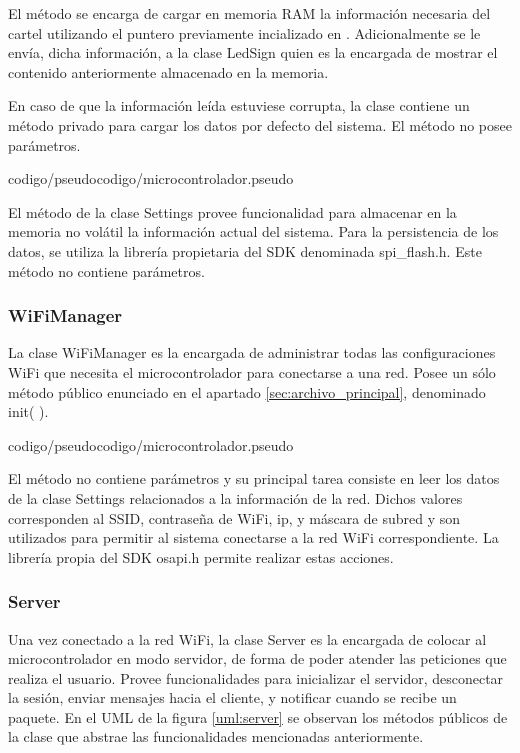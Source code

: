 El método  se encarga de cargar en memoria RAM la información necesaria del cartel utilizando el puntero previamente incializado en .
Adicionalmente se le envía, dicha información, a la clase LedSign quien es la encargada de mostrar el contenido anteriormente almacenado en la memoria.

En caso de que la información leída estuviese corrupta, la clase contiene un método privado para cargar los datos por defecto del sistema.
El método no posee parámetros.

 {codigo/pseudocodigo/microcontrolador.pseudo}

El método  de la clase Settings provee funcionalidad para almacenar en la memoria no volátil la información actual del sistema.
Para la persistencia de los datos, se utiliza la librería propietaria del SDK denominada spi\_flash.h.
Este método no contiene parámetros.


\subsubsection{WiFiManager}

La clase WiFiManager es la encargada de administrar todas las configuraciones WiFi que necesita el microcontrolador para conectarse a una red.
Posee un sólo método público enunciado en el apartado \ref{sec:archivo_principal}, denominado init( ).

 {codigo/pseudocodigo/microcontrolador.pseudo}

El método no contiene parámetros y su principal tarea consiste en leer los datos de la clase Settings relacionados a la información de la red.
Dichos valores corresponden al SSID, contraseña de WiFi, ip, y máscara de subred y son utilizados para permitir al sistema conectarse a la red WiFi correspondiente.
La librería propia del SDK osapi.h permite realizar estas acciones.



\subsubsection{Server}

Una vez conectado a la red WiFi, la clase Server es la encargada de colocar al microcontrolador en modo servidor, de forma de poder atender las peticiones que realiza el usuario.
Provee funcionalidades para inicializar el servidor, desconectar la sesión, enviar mensajes hacia el cliente, y notificar cuando se recibe un paquete.
En el UML de la figura \ref{uml:server} se observan los métodos públicos de la clase que abstrae las funcionalidades mencionadas anteriormente.

